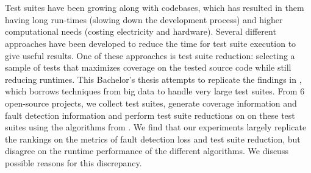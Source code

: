 \chapter{\abstractname}

Test suites have been growing along with codebases, which has resulted
in them having long run-times (slowing down the development process) and
higher computational needs (costing electricity and hardware). Several
different approaches have been developed to reduce the time for test suite
execution to give useful results. One of these approaches is test suite
reduction: selecting a sample of tests that maximizes coverage on the
tested source code while still reducing runtimes. This Bachelor's thesis
attempts to replicate the findings in \cite{cruciani2019scalable},
which borrows techniques from big data to handle very large test
suites. From 6 open-source projects, we collect test suites, generate
coverage information and fault detection information and perform test
suite reductions on on these test suites using the algorithms from
\cite{cruciani2019scalable}. We find that our experiments largely
replicate the rankings on the metrics of fault detection loss and test
suite reduction, but disagree on the runtime performance of the different
algorithms. We discuss possible reasons for this discrepancy.
